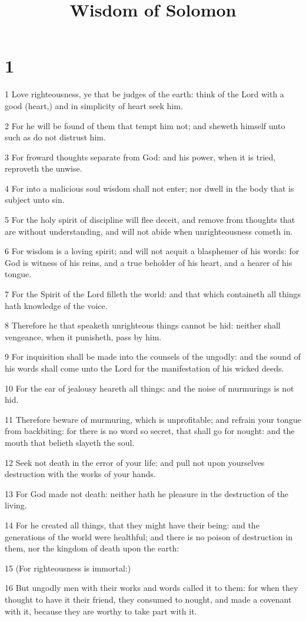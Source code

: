 

\title{Wisdom of Solomon}


\chapter{1}

\par 1 Love righteousness, ye that be judges of the earth: think of the Lord with a good (heart,) and in simplicity of heart seek him.
\par 2 For he will be found of them that tempt him not; and sheweth himself unto such as do not distrust him.
\par 3 For froward thoughts separate from God: and his power, when it is tried, reproveth the unwise.
\par 4 For into a malicious soul wisdom shall not enter; nor dwell in the body that is subject unto sin.
\par 5 For the holy spirit of discipline will flee deceit, and remove from thoughts that are without understanding, and will not abide when unrighteousness cometh in.
\par 6 For wisdom is a loving spirit; and will not acquit a blasphemer of his words: for God is witness of his reins, and a true beholder of his heart, and a hearer of his tongue.
\par 7 For the Spirit of the Lord filleth the world: and that which containeth all things hath knowledge of the voice.
\par 8 Therefore he that speaketh unrighteous things cannot be hid: neither shall vengeance, when it punisheth, pass by him.
\par 9 For inquisition shall be made into the counsels of the ungodly: and the sound of his words shall come unto the Lord for the manifestation of his wicked deeds.
\par 10 For the ear of jealousy heareth all things: and the noise of murmurings is not hid.
\par 11 Therefore beware of murmuring, which is unprofitable; and refrain your tongue from backbiting: for there is no word so secret, that shall go for nought: and the mouth that belieth slayeth the soul.
\par 12 Seek not death in the error of your life: and pull not upon yourselves destruction with the works of your hands.
\par 13 For God made not death: neither hath he pleasure in the destruction of the living.
\par 14 For he created all things, that they might have their being: and the generations of the world were healthful; and there is no poison of destruction in them, nor the kingdom of death upon the earth:
\par 15 (For righteousness is immortal:)
\par 16 But ungodly men with their works and words called it to them: for when they thought to have it their friend, they consumed to nought, and made a covenant with it, because they are worthy to take part with it.

